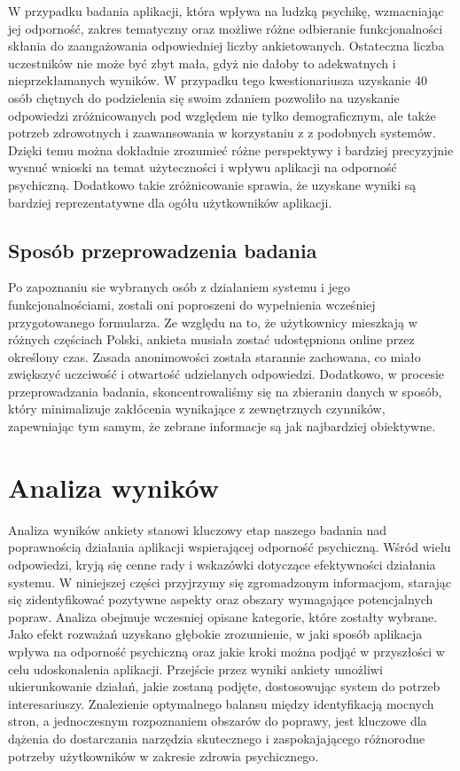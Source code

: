 W przypadku badania aplikacji, która wpływa na ludzką psychikę, wzmacniając jej odporność, zakres tematyczny oraz możliwe różne odbieranie funkcjonalności skłania do zaangażowania odpowiedniej liczby ankietowanych. Ostateczna liczba uczestników nie może być zbyt mała, gdyż nie dałoby to adekwatnych i nieprzekłamanych wyników. W przypadku tego kwestionariusza uzyskanie 40 osób chętnych do podzielenia się swoim zdaniem pozwoliło na uzyskanie odpowiedzi zróżnicowanych pod względem nie tylko demograficznym, ale także potrzeb zdrowotnych i zaawansowania w korzystaniu z z podobnych systemów. Dzięki temu można dokładnie zrozumieć różne perspektywy i bardziej precyzyjnie wysnuć wnioski na temat użyteczności i wpływu aplikacji na odporność psychiczną. Dodatkowo takie zróżnicowanie sprawia, że uzyskane wyniki są bardziej reprezentatywne dla ogółu użytkowników aplikacji.

\subsection{Sposób przeprowadzenia badania}
Po zapoznaniu sie wybranych osób z działaniem systemu i jego funkcjonalnościami, zostali oni poproszeni do wypełnienia wcześniej przygotowanego formularza. Ze względu na to, że użytkownicy mieszkają w różnych częściach Polski, ankieta musiała zostać udostępniona online przez określony czas. Zasada anonimowości została starannie zachowana, co miało zwiększyć uczciwość i otwartość udzielanych odpowiedzi. Dodatkowo, w procesie przeprowadzania badania, skoncentrowaliśmy się na zbieraniu danych w sposób, który minimalizuje zakłócenia wynikające z zewnętrznych czynników, zapewniając tym samym, że zebrane informacje są jak najbardziej obiektywne.



\section{Analiza wyników}
Analiza wyników ankiety stanowi kluczowy etap naszego badania nad poprawnością działania aplikacji wspierającej odporność psychiczną. Wśród wielu odpowiedzi, kryją się cenne rady i wskazówki dotyczące efektywności działania systemu. W niniejszej części przyjrzymy się zgromadzonym informacjom, starając się zidentyfikować pozytywne aspekty oraz obszary wymagające potencjalnych popraw. Analiza obejmuje wczesniej opisane kategorie, które zostałty wybrane. Jako efekt rozważań uzyskano głębokie zrozumienie, w jaki sposób aplikacja wpływa na odporność psychiczną oraz jakie kroki można podjąć w przyszłości w celu udoskonalenia aplikacji. Przejście przez wyniki ankiety umożliwi ukierunkowanie działań, jakie zostaną podjęte, dostosowując system do potrzeb interesariuszy.  Znalezienie optymalnego balansu między identyfikacją mocnych stron, a jednoczesnym rozpoznaniem obszarów do poprawy, jest kluczowe dla dążenia do dostarczania narzędzia skutecznego i zaspokajającego różnorodne potrzeby użytkowników w zakresie zdrowia psychicznego. 

